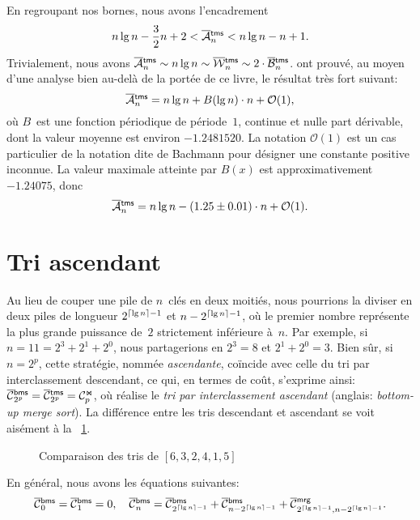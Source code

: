 En regroupant nos bornes, nous avons l'encadrement
\begin{equation*}
n\lg n - \frac{3}{2}n + 2 < \OM{\fun{tms}}{n} < n\lg n - n + 1.
\end{equation*}
Trivialement, nous avons \(\OM{\fun{tms}}{n} \sim n\lg n \sim
\OW{\fun{tms}}{n} \sim 2 \cdot \OB{\fun{tms}}{n}\).
\cite{FlajoletGolin_1994} ont prouvé, au moyen d'une analyse bien
au-delà de la portée de ce livre, le résultat très fort suivant:
\begin{equation*}
\OM{\fun{tms}}{n} = n\lg n + B(\lg n) \cdot n + \mathcal{O}(1),
\end{equation*}
où \(B\)~est une fonction périodique de période~\(1\), continue et
nulle part dérivable, dont la valeur moyenne est environ
\(-1.2481520\). La notation \(\mathcal{O}(1)\) est un cas particulier
de la notation dite de Bachmann pour désigner une constante positive
inconnue. La valeur maximale atteinte par \(B(x)\) est
approximativement \(-1.24075\), donc
\begin{equation*}
\belowdisplayskip=0pt
\OM{\fun{tms}}{n} = n\lg n - (1.25 \pm 0.01) \cdot n + \mathcal{O}(1).
\end{equation*}
  


\section{Tri ascendant}
\label{sec:general_case}

Au lieu de couper une pile de \(n\)~clés en deux moitiés, nous
pourrions la diviser en deux piles de longueur \(2^{\lceil{\lg
    n}\rceil-1}\) et \(n-2^{\lceil{\lg n}\rceil-1}\), où le premier nombre
représente la plus grande puissance de~\(2\) strictement inférieure
à~\(n\). Par exemple, si \(n=11=2^3+2^1+2^0\), nous partagerions en
\(2^3=8\) et \(2^1+2^0=3\). Bien sûr, si \(n=2^p\), cette stratégie,
nommée \emph{ascendante}, coïncide avec celle du tri par
interclassement descendant, ce qui, en termes de coût, s'exprime
ainsi: \(\OC{\fun{bms}}{2^p} = \OC{\fun{tms}}{2^p} = \C{\Join}{p}\),
où  réalise le \emph{tri par
  interclassement ascendant} (anglais: \emph{bottom-up merge
sort}). La différence entre les tris descendant et ascendant se voit
aisément à la \fig~\ref{fig:top_vs_bot}.
\begin{figure}[!b]
\centering
{}
\qquad
{}
\caption{Comparaison des tris de \([6,3,2,4,1,5]\)}
\label{fig:top_vs_bot}
\end{figure}
En général, nous avons les équations suivantes:
\begin{equation}
\OC{\fun{bms}}{0} = \OC{\fun{bms}}{1} = 0,
\quad
\OC{\fun{bms}}{n} = \OC{\fun{bms}}{2^{\ceiling{\lg n}-1}}
+ \OC{\fun{bms}}{n - 2^{\ceiling{\lg n}-1}}
+ \OC{\fun{mrg}}{2^{\ceiling{\lg n}-1},n - 2^{\ceiling{\lg n}-1}}.
\index{bms@$\OC{\fun{bms}}{n}$}
\label{eq:cost_bms}
\end{equation}

